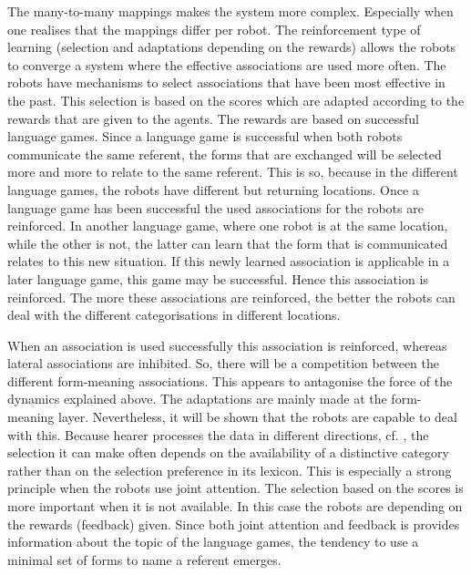The many-to-many mappings makes the system more complex. Especially when one realises that the mappings differ per robot. The reinforcement type of learning (selection and adaptations depending on the rewards) allows the robots to converge a system where the effective associations are used more often. The robots have mechanisms to select associations that have been most effective in the past. This selection is based on the scores which are adapted according to the rewards that are given to the agents. The rewards are based on successful language games. Since a language game is successful when both robots communicate the same referent, the forms that are exchanged will be selected more and more to relate to the same referent. This is so, because in the different language games, the robots have different but returning locations. Once a language game has been successful the used associations for the robots are reinforced. In another language game, where one robot is at the same location, while the other is not, the latter can learn that the form that is communicated relates to this new situation. If this newly learned association is applicable in a later language game, this game may be successful. Hence this association is reinforced. The more these associations are reinforced, the better the robots can deal with the different categorisations in different locations.

When an association is used successfully this association is reinforced, whereas lateral associations are inhibited. So, there will be a competition between the different form-meaning associations. This appears to antagonise the force of the dynamics explained above. The adaptations are mainly made at the form-meaning layer. Nevertheless, it will be shown that the robots are capable to deal with this. Because hearer processes the data in different directions, cf. , the selection it can make often depends on the availability of a distinctive category rather than on the selection preference in its lexicon. This is especially a strong principle when the robots use joint attention. The selection based on the scores is more important when it is not available. In this case the robots are depending on the rewards (feedback) given. Since both joint attention and feedback is provides information about the topic of the language games, the tendency to use a minimal set of forms to name a referent emerges.

